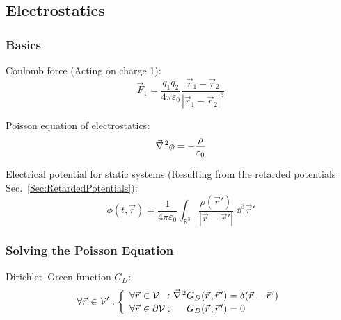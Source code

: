 	\subsection{Electrostatics}
		\subsubsection{Basics}
			\noindent
			Coulomb force (Acting on charge 1):
			\begin{equation}
				\vec{F}_1 = \frac{q_1 q_2}{4\pi\varepsilon_0}\frac{\vec{r}_1-\vec{r}_2}{\left|\vec{r}_1-\vec{r}_2\right|^3}
			\end{equation}

			\noindent
			Poisson equation of electrostatics:
			\begin{equation}
				\Nabla^2\phi = -\frac{\rho}{\varepsilon_0}
				\label{Eq:Poisson}
			\end{equation}

			\noindent
			Electrical potential for static systems (Resulting from the retarded potentials Sec.~\ref{Sec:RetardedPotentials}):
			\begin{equation}
				\phi\left(t,\vec{r}\right)
				= \frac{1}{4\pi\varepsilon_0} \int_{\mathbb{R}^3} \frac{\rho(\vec{r}')}{\left|\vec{r}-\vec{r}'\right|}\;\dd^3 \vec{r}'
			\end{equation}

		\subsubsection{Solving the Poisson Equation}
			\noindent
			Dirichlet--Green function $G_D$:
			\begin{equation}
				\forall\vec{r}\in\mathcal{V}': \left\{\begin{array}{ll}
					\forall\vec{r}\in\mathcal{V}\phantom\partial:
					\Nabla^2 G_D(\vec{r},\vec{r}') = \delta(\vec{r}-\vec{r}') \\
					\forall\vec{r}\in\partial\mathcal{V}:
					\phantom{\Nabla^2}G_D(\vec{r},\vec{r}') = 0
				\end{array}\right.
			\end{equation}

